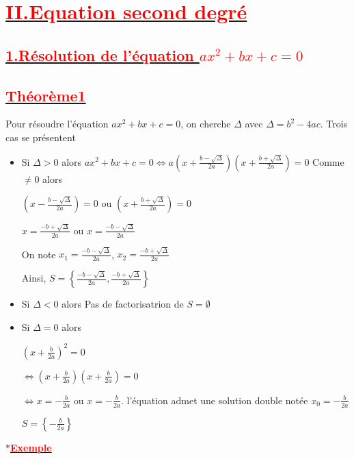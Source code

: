 \documentclass[12pt]{article}
\begin{document}
\section*{\underline{\textbf{\textcolor{red}{II.Equation second degré}}}}
\subsection*{\underline{\textbf{\textcolor{red}{1.Résolution de l'équation $ax^{2}+bx+c=0$}}}}
\subsection*{\underline{\textbf{\textcolor{red}{Théorème1}}}}
Pour résoudre l'équation $ax^{2}+bx+c=0$, on cherche $\Delta$ avec $\Delta=b^{2}-4ac$.
Trois cas se présentent\\
\begin{itemize}
\item Si $\Delta >0$ alors
$ax^{2}+bx+c=0 \Leftrightarrow a\left(x+\frac{b-\sqrt{\Delta}}{2a} \right)\left(x+\frac{b+\sqrt{\Delta}}{2a} \right)=0$
Comme $\neq 0$ alors 

$ \left(x-\frac{b-\sqrt{\Delta}}{2a} \right)=0$ ou 
$\left(x+\frac{b+\sqrt{\Delta}}{2a} \right)=0$

$x=\frac{-b+\sqrt{\Delta}}{2a}$ ou $x=\frac{-b-\sqrt{\Delta}}{2a}$

On note $x_{1}=\frac{-b-\sqrt{\Delta}}{2a}$, $x_{2}=\frac{-b+\sqrt{\Delta}}{2a}$

Ainsi, $S=\left\lbrace \frac{-b-\sqrt{\Delta}}{2a}, \frac{-b+\sqrt{\Delta}}{2a} \right\rbrace $
\item Si $\Delta < 0$ alors Pas de factorisatrion de $S=\emptyset$
\item Si $\Delta = 0$ alors 

$\left( x+\frac{b}{2a}\right)^{2}=0$

$\Leftrightarrow \left( x+\frac{b}{2a}\right) \left( x+\frac{b}{2a}\right)=0$ 

$\Leftrightarrow x=-\frac{b}{2a}$ ou $x=-\frac{b}{2a}$.
l'équation admet une solution double notée $x_{0}=-\frac{b}{2a}$

$ S = \left\lbrace -\frac{b}{2a} \right\rbrace  $
\end{itemize}
$\ast$\underline{\textbf{\textcolor{red}{Exemple}}}\\
\end{document}
